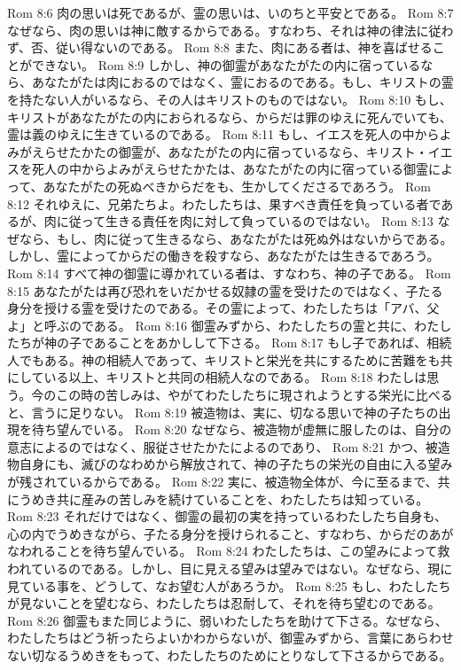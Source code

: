 Rom 8:6  肉の思いは死であるが、霊の思いは、いのちと平安とである。
Rom 8:7  なぜなら、肉の思いは神に敵するからである。すなわち、それは神の律法に従わず、否、従い得ないのである。
Rom 8:8  また、肉にある者は、神を喜ばせることができない。
Rom 8:9  しかし、神の御霊があなたがたの内に宿っているなら、あなたがたは肉におるのではなく、霊におるのである。もし、キリストの霊を持たない人がいるなら、その人はキリストのものではない。
Rom 8:10  もし、キリストがあなたがたの内におられるなら、からだは罪のゆえに死んでいても、霊は義のゆえに生きているのである。
Rom 8:11  もし、イエスを死人の中からよみがえらせたかたの御霊が、あなたがたの内に宿っているなら、キリスト・イエスを死人の中からよみがえらせたかたは、あなたがたの内に宿っている御霊によって、あなたがたの死ぬべきからだをも、生かしてくださるであろう。
Rom 8:12  それゆえに、兄弟たちよ。わたしたちは、果すべき責任を負っている者であるが、肉に従って生きる責任を肉に対して負っているのではない。
Rom 8:13  なぜなら、もし、肉に従って生きるなら、あなたがたは死ぬ外はないからである。しかし、霊によってからだの働きを殺すなら、あなたがたは生きるであろう。
Rom 8:14  すべて神の御霊に導かれている者は、すなわち、神の子である。
Rom 8:15  あなたがたは再び恐れをいだかせる奴隷の霊を受けたのではなく、子たる身分を授ける霊を受けたのである。その霊によって、わたしたちは「アバ、父よ」と呼ぶのである。
Rom 8:16  御霊みずから、わたしたちの霊と共に、わたしたちが神の子であることをあかしして下さる。
Rom 8:17  もし子であれば、相続人でもある。神の相続人であって、キリストと栄光を共にするために苦難をも共にしている以上、キリストと共同の相続人なのである。
Rom 8:18  わたしは思う。今のこの時の苦しみは、やがてわたしたちに現されようとする栄光に比べると、言うに足りない。
Rom 8:19  被造物は、実に、切なる思いで神の子たちの出現を待ち望んでいる。
Rom 8:20  なぜなら、被造物が虚無に服したのは、自分の意志によるのではなく、服従させたかたによるのであり、
Rom 8:21  かつ、被造物自身にも、滅びのなわめから解放されて、神の子たちの栄光の自由に入る望みが残されているからである。
Rom 8:22  実に、被造物全体が、今に至るまで、共にうめき共に産みの苦しみを続けていることを、わたしたちは知っている。
Rom 8:23  それだけではなく、御霊の最初の実を持っているわたしたち自身も、心の内でうめきながら、子たる身分を授けられること、すなわち、からだのあがなわれることを待ち望んでいる。
Rom 8:24  わたしたちは、この望みによって救われているのである。しかし、目に見える望みは望みではない。なぜなら、現に見ている事を、どうして、なお望む人があろうか。
Rom 8:25  もし、わたしたちが見ないことを望むなら、わたしたちは忍耐して、それを待ち望むのである。
Rom 8:26  御霊もまた同じように、弱いわたしたちを助けて下さる。なぜなら、わたしたちはどう祈ったらよいかわからないが、御霊みずから、言葉にあらわせない切なるうめきをもって、わたしたちのためにとりなして下さるからである。
